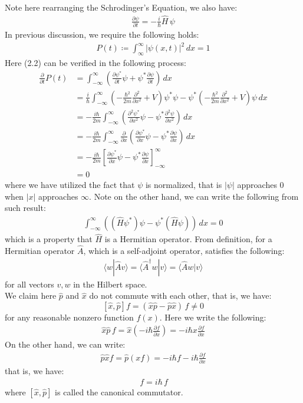 \documentclass[11pt]{book}
\theoremstyle{break}
\theoremstyle{break}
\newcommand{\pd}{\partial}
\begin{document}
Note here rearranging the Schrodinger's Equation, we also have:
\begin{align*}
 \frac{ \pd \psi}{\pd t} = -\frac{i}{\hbar}\hat{H}\, \psi
\end{align*}
In previous discussion, we require the following holds:
\begin{align}
P(t) \coloneqq  \int_{\infty}^{\infty}  |\psi(x,t)|^2 \, dx = 1
\end{align}
Here (2.2) can be verified in the following process:
\begin{align*}
\frac{\pd}{\pd t}P(t) 
&= \int_{-\infty}^\infty \left( \frac{\pd \psi^*}{\pd t}\psi + \psi^* \frac{\pd \psi}{\pd t}\right) \, dx \\
&= \frac{i}{\hbar} \int_{-\infty}^{\infty} \left( - \frac{\hbar^2}{2m}\frac{\pd^2}{\pd x^2}+ V\right)\psi^* \psi - \psi^* \left( -\frac{\hbar^2}{2m}\frac{\pd^2}{\pd x^2}+ V\right) \psi \, dx \\
&= - \frac{i\hbar}{2m}\int_{-\infty}^\infty \left( \frac{\pd^2\psi^*}{\pd x^2}\psi - \psi^*\frac{\pd^2 \psi}{\pd x^2}\right) \, dx\\
&= -\frac{i\hbar}{2m}\int_{-\infty}^\infty \frac{\pd}{\pd x}\left( \frac{\pd \psi^*}{\pd x}\psi - \psi^* \frac{\pd \psi}{\pd x}\right)\, dx\\
&= -\frac{i\hbar}{2m}\left[ \frac{\pd \psi^*}{\pd x}\psi - \psi^* \frac{\pd \psi}{\pd x} \right]_{-\infty}^\infty\\
&= 0
\end{align*}
where we have utilized the fact that $\psi$ is normalized, that is $|\psi|$ approaches $0$ when $|x|$ approaches $\infty$. Note on the other hand, we can write the following from such result:
\begin{align*}
\int_{-\infty}^\infty \left((\hat{H}\psi^*)\psi - \psi^*(\hat{H}\psi) \right)\, dx = 0
\end{align*}
which is a property that $\hat{H}$ is a Hermitian operator. From definition, for a Hermitian operator $\hat{A}$, which is a self-adjoint operator, satisfies the following:
\begin{align*}
\langle w| \hat{A} v\rangle = \langle \hat{A}^\dagger w| v\rangle =\langle \hat{A} w| v\rangle 
\end{align*}
for all vectors $v,w$ in the Hilbert space. \\

We claim here $\hat{p}$ and $\hat{x}$ do not commute with each other, that is, we have: $$[\hat{x},\hat{p}]f = (\hat{x}\hat{p} - \hat{p}\hat{x})\,f \neq 0$$
for any reasonable nonzero function $f(x)$. Here we write the following:
\begin{align*}
\hat{x}\hat{p}\,f = \hat{x}\left( -i\hbar \frac{\pd f}{\pd x}\right) = -i\hbar x \frac{\pd f}{\pd x}
\end{align*}
On the other hand, we can write:
\begin{align*}
\hat{p}\hat{x}f = \hat{p}(xf) =-i\hbar f -i\hbar \frac{\pd f}{\pd x}
\end{align*}
that is, we have:
\begin{align*}
[\hat{x},\hat{p}]\,f = i\hbar\, f
\end{align*}
where $[\hat{x},\hat{p}]$ is called the canonical commutator. 
\end{document}
